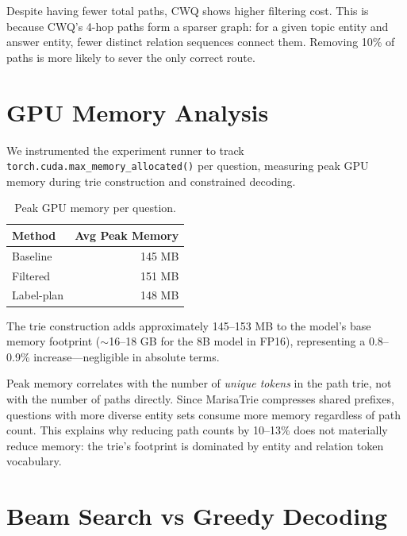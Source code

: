 \documentclass[11pt,twoside]{article}
\begin{document}
Despite having fewer total paths, CWQ shows higher filtering cost. This is
because CWQ's 4-hop paths form a sparser graph: for a given topic entity and
answer entity, fewer distinct relation sequences connect them. Removing 10\% of
paths is more likely to sever the only correct route.

\section{GPU Memory Analysis}
\label{sec:memory}

We instrumented the experiment runner to track
\texttt{torch.cuda.max\_memory\_allocated()} per question, measuring peak GPU
memory during trie construction and constrained decoding.

\begin{table}[H]
  \centering
  \caption{Peak GPU memory per question.}
  \label{tab:memory}
  \begin{tabular}{lr}
    \toprule
    \textbf{Method} & \textbf{Avg Peak Memory} \\
    \midrule
    Baseline & 145 MB \\
    Filtered & 151 MB \\
    Label-plan & 148 MB \\
    \bottomrule
  \end{tabular}
\end{table}

The trie construction adds approximately 145--153 MB to the model's base memory
footprint (\(\sim\)16--18 GB for the 8B model in FP16), representing a 0.8--0.9\%
increase---negligible in absolute terms.

Peak memory correlates with the number of \emph{unique tokens} in the path trie,
not with the number of paths directly. Since MarisaTrie compresses shared
prefixes, questions with more diverse entity sets consume more memory regardless
of path count. This explains why reducing path counts by 10--13\% does not
materially reduce memory: the trie's footprint is dominated by entity and
relation token vocabulary.

\section{Beam Search vs Greedy Decoding}
\label{sec:beam-vs-greedy}
\end{document}
